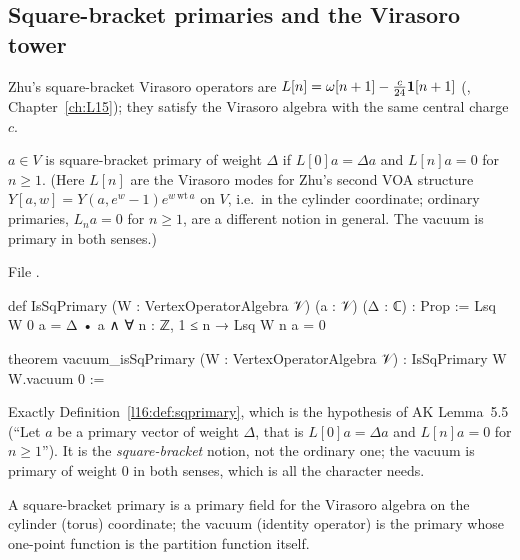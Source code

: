 \subsection{Square-bracket primaries and the Virasoro tower}

Zhu's square-bracket Virasoro operators are $L[n] = \omega[n+1] - \frac{c}{24}\mathbf{1}[n+1]$ (,
Chapter~\ref{ch:L15}); they satisfy the Virasoro algebra with the same central charge $c$.

\begin{definition}\label{l16:def:sqprimary}
$a\in V$ is square-bracket primary of weight $\Delta$ if $L[0]a = \Delta a$ and $L[n]a = 0$ for $n\ge1$. (Here $L[n]$ are the
Virasoro modes for Zhu's second VOA structure $Y[a,w] = Y(a,e^w-1)e^{w\,\mathrm{wt}\,a}$ on $V$, i.e.\ in the cylinder
coordinate; ordinary primaries, $L_na = 0$ for $n\ge1$, are a different notion in general. The vacuum is primary in both
senses.)
\end{definition}
\noindent File .
\begin{leancode}
def IsSqPrimary (W : VertexOperatorAlgebra 𝒱) (a : 𝒱) (Δ : ℂ) : Prop :=
  Lsq W 0 a = Δ • a ∧ ∀ n : ℤ, 1 ≤ n → Lsq W n a = 0

theorem vacuum_isSqPrimary (W : VertexOperatorAlgebra 𝒱) : IsSqPrimary W W.vacuum 0 :=
\end{leancode}

\begin{dictionary}
Exactly Definition~\ref{l16:def:sqprimary}, which is the hypothesis of AK Lemma~5.5 (``Let $a$ be a primary vector of
weight $\Delta$, that is $L[0]a = \Delta a$ and $L[n]a = 0$ for $n\ge1$''). It is the \emph{square-bracket} notion, not
the ordinary one; the vacuum is primary of weight $0$ in both senses, which is all the character needs.
\end{dictionary}

\begin{physics}
A square-bracket primary is a primary field for the Virasoro algebra on the cylinder (torus) coordinate; the vacuum
(identity operator) is the primary whose one-point function is the partition function itself.
\end{physics}


